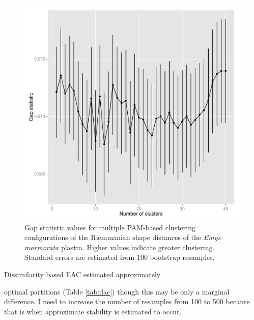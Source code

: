 \documentclass{article}\usepackage{graphicx, color}
\makeatletter
\newenvironment{kframe}{%
 \def\at@end@of@kframe{}%
 \ifinner\ifhmode%
  \def\at@end@of@kframe{\end{minipage}}%
  \begin{minipage}{\columnwidth}%
 \fi\fi%
 \def\FrameCommand##1{\hskip\@totalleftmargin \hskip-\fboxsep
 \colorbox{shadecolor}{##1}\hskip-\fboxsep
     \hskip-\linewidth \hskip-\@totalleftmargin \hskip\columnwidth}%
 \MakeFramed {\advance\hsize-\width
   \@totalleftmargin\z@ \linewidth\hsize
   \@setminipage}}%
 {\par\unskip\endMakeFramed%
 \at@end@of@kframe}
\newenvironment{knitrout}{}{} %
\makeatother
\begin{document}
\begin{figure}[ht]
  \centering
  \includegraphics[width = \textwidth, keepaspectratio = true]{figure/gap}
  \caption{Gap statistic values for multiple PAM-based clustering configurations of the Riemmanian shape distances of the \textit{Emys marmorata} plastra. Higher values indicate greater clustering. Standard errors are estimated from 100 bootstrap resamples.}
  \label{fig:gap}
\end{figure}

\begin{knitrout}
\color{fgcolor}\begin{kframe}


{\ttfamily\noindent\bfseries\color{errorcolor}{\#\# Error: object 'tadult.gap' not found}}

{\ttfamily\noindent\bfseries\color{errorcolor}{\#\# Error: object 'ad.gap' not found}}\end{kframe}
\end{knitrout}



Dissimilarity based EAC estimated approximately 

{\ttfamily\noindent\bfseries\color{errorcolor}{\\Error in eval(expr, envir, enclos) : object 'tmorph.dac' not found}} optimal partitions (Table \ref{tab:dac}) though this may be only a marginal difference. I need to increase the number of resamples from 100 to 500 because that is when approximate stability is estimated to occur. 
\end{document}
